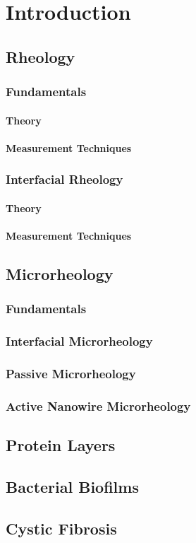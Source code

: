 \chapter{Introduction}

\section{Rheology}
\subsection{Fundamentals}
\subsubsection{Theory}
\subsubsection{Measurement Techniques}
\subsection{Interfacial Rheology}
\subsubsection{Theory}
\subsubsection{Measurement Techniques}
\section{Microrheology}
\subsection{Fundamentals}
\subsection{Interfacial Microrheology}
\subsection{Passive Microrheology}
\subsection{Active Nanowire Microrheology}

\section{Protein Layers}
\section{Bacterial Biofilms}
\section{Cystic Fibrosis}